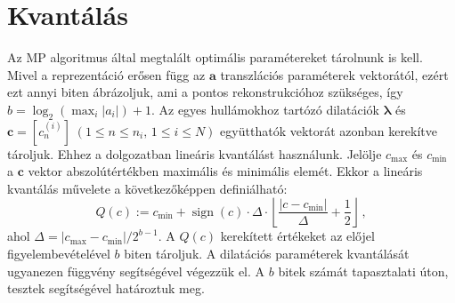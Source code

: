 \documentclass[oneside,titlepage,12pt,a4paper]{report}
\DeclareMathOperator{\sgn}{sign}
\begin{document}
\section{Kvantálás}
Az MP algoritmus által megtalált optimális paramétereket tárolnunk is kell. Mivel a reprezentáció erősen függ az $\mathbf{a}$ transzlációs paraméterek vektorától, ezért ezt annyi biten ábrázoljuk, ami a pontos rekonstrukcióhoz szükséges, így $b=\log_2(\displaystyle{\max_{i}\left|a_i\right|})+1.$ Az egyes hullámokhoz tartózó dilatációk $\boldsymbol{\lambda}$ és $\mathbf{c}=[c_{n}^{(i)}] \; (1\leq n \leq n_i, \, 1\leq i\leq N)$ együtthatók vektorát azonban kerekítve tároljuk. Ehhez a dolgozatban lineáris kvantálást használunk. Jelölje $c_{\max}$ és $c_{\min}$ a $\mathbf{c}$ vektor abszolútértékben maximális és minimális elemét. Ekkor a lineáris kvantálás művelete a következőképpen definiálható:
\begin{equation}
	Q(c):=c_{\min}+\sgn(c) \cdot \Delta \cdot \left\lfloor \frac{\left|c-c_{\min}\right|}{\Delta}+\frac{1}{2}\right\rfloor\,,
\label{eq:quant}
\end{equation}
ahol $\Delta=\left|c_{\max}-c_{\min}\right|/2^{b-1}.$ A $Q(c)$ kerekített értékeket az előjel figyelembevételével $b$ biten tároljuk. A dilatációs paraméterek kvantálását ugyanezen függvény segítségével végezzük el. A $b$ bitek számát tapasztalati úton, tesztek segítségével határoztuk meg. 
\end{document}
